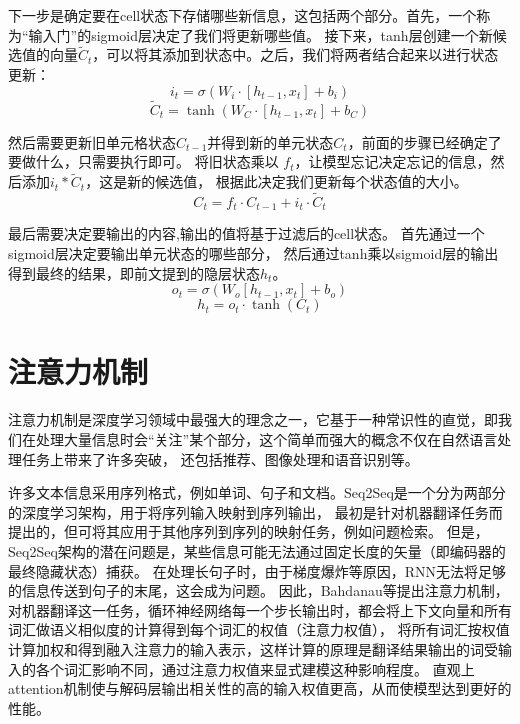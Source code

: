   下一步是确定要在cell状态下存储哪些新信息，这包括两个部分。首先，一个称为“输入门”的sigmoid层决定了我们将更新哪些值。
  接下来，tanh层创建一个新候选值的向量$\tilde{C}_{t}$，可以将其添加到状态中。之后，我们将两者结合起来以进行状态更新：
  \begin{equation}
    i_{t} =\sigma\left(W_{i} \cdot\left[h_{t-1}, x_{t}\right]+b_{i}\right) 
  \end{equation}  
    \begin{equation}
      \tilde{C}_{t} =\tanh \left(W_{C} \cdot\left[h_{t-1}, x_{t}\right]+b_{C}\right)
      \end{equation}   

然后需要更新旧单元格状态$C_{t-1}$并得到新的单元状态$C_{t}$，前面的步骤已经确定了要做什么，只需要执行即可。
将旧状态乘以 $f_{t}$，让模型忘记决定忘记的信息，然后添加$i_{t} * \tilde{C}_{t}$，这是新的候选值，
根据此决定我们更新每个状态值的大小。
\begin{equation}
C_{t}=f_{t} \cdot C_{t-1}+i_{t} \cdot \tilde{C}_{t}
\end{equation} 

最后需要决定要输出的内容,输出的值将基于过滤后的cell状态。
首先通过一个sigmoid层决定要输出单元状态的哪些部分，
然后通过tanh乘以sigmoid层的输出得到最终的结果，即前文提到的隐层状态$h_{t}$。
\begin{equation}
  o_{t}=\sigma\left(W_{o}\left[h_{t-1}, x_{t}\right]+b_{o}\right)
\end{equation} 
\begin{equation}
  h_{t}=o_{t} \cdot \tanh \left(C_{t}\right)
\end{equation}


\section{注意力机制}
注意力机制是深度学习领域中最强大的理念之一，它基于一种常识性的直觉，即我们在处理大量信息时会“关注”某个部分，这个简单而强大的概念不仅在自然语言处理任务上带来了许多突破，
还包括推荐、图像处理和语音识别等。

许多文本信息采用序列格式，例如单词、句子和文档。Seq2Seq是一个分为两部分的深度学习架构，用于将序列输入映射到序列输出，
最初是针对机器翻译任务而提出的，但可将其应用于其他序列到序列的映射任务，例如问题检索。
但是，Seq2Seq架构的潜在问题是，某些信息可能无法通过固定长度的矢量（即编码器的最终隐藏状态）捕获。
在处理长句子时，由于梯度爆炸等原因，RNN无法将足够的信息传送到句子的末尾，这会成为问题。
因此，Bahdanau等\cite{bahdanau2014neural}提出注意力机制，对机器翻译这一任务，循环神经网络每一个步长输出时，都会将上下文向量和所有词汇做语义相似度的计算得到每个词汇的权值（注意力权值），
将所有词汇按权值计算加权和得到融入注意力的输入表示，这样计算的原理是翻译结果输出的词受输入的各个词汇影响不同，通过注意力权值来显式建模这种影响程度。
直观上attention机制使与解码层输出相关性的高的输入权值更高，从而使模型达到更好的性能。

